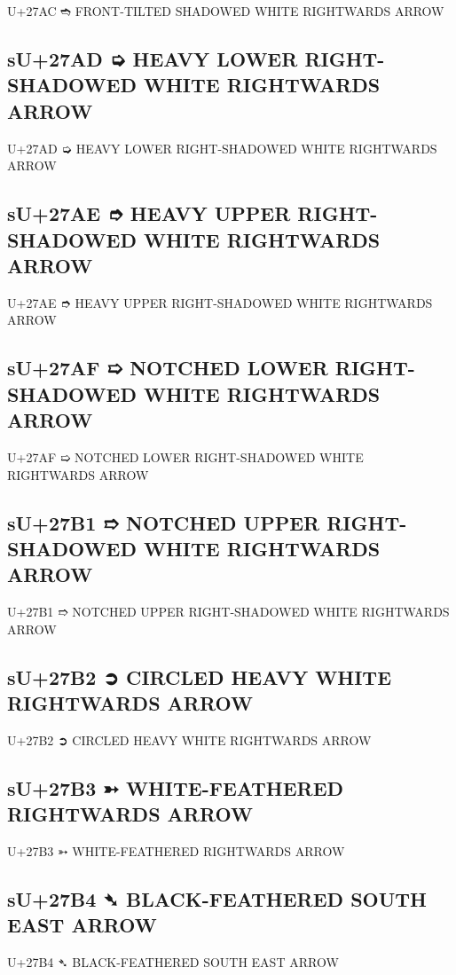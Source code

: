 U+27AC ➬ FRONT-TILTED SHADOWED WHITE RIGHTWARDS ARROW

\subsection{sU+27AD ➭ HEAVY LOWER RIGHT-SHADOWED WHITE RIGHTWARDS ARROW}

U+27AD ➭ HEAVY LOWER RIGHT-SHADOWED WHITE RIGHTWARDS ARROW

\subsection{sU+27AE ➮ HEAVY UPPER RIGHT-SHADOWED WHITE RIGHTWARDS ARROW}

U+27AE ➮ HEAVY UPPER RIGHT-SHADOWED WHITE RIGHTWARDS ARROW

\subsection{sU+27AF ➯ NOTCHED LOWER RIGHT-SHADOWED WHITE RIGHTWARDS ARROW}

U+27AF ➯ NOTCHED LOWER RIGHT-SHADOWED WHITE RIGHTWARDS ARROW

\subsection{sU+27B1 ➱ NOTCHED UPPER RIGHT-SHADOWED WHITE RIGHTWARDS ARROW}

U+27B1 ➱ NOTCHED UPPER RIGHT-SHADOWED WHITE RIGHTWARDS ARROW

\subsection{sU+27B2 ➲ CIRCLED HEAVY WHITE RIGHTWARDS ARROW}

U+27B2 ➲ CIRCLED HEAVY WHITE RIGHTWARDS ARROW

\subsection{sU+27B3 ➳ WHITE-FEATHERED RIGHTWARDS ARROW}

U+27B3 ➳ WHITE-FEATHERED RIGHTWARDS ARROW

\subsection{sU+27B4 ➴ BLACK-FEATHERED SOUTH EAST ARROW}

U+27B4 ➴ BLACK-FEATHERED SOUTH EAST ARROW

